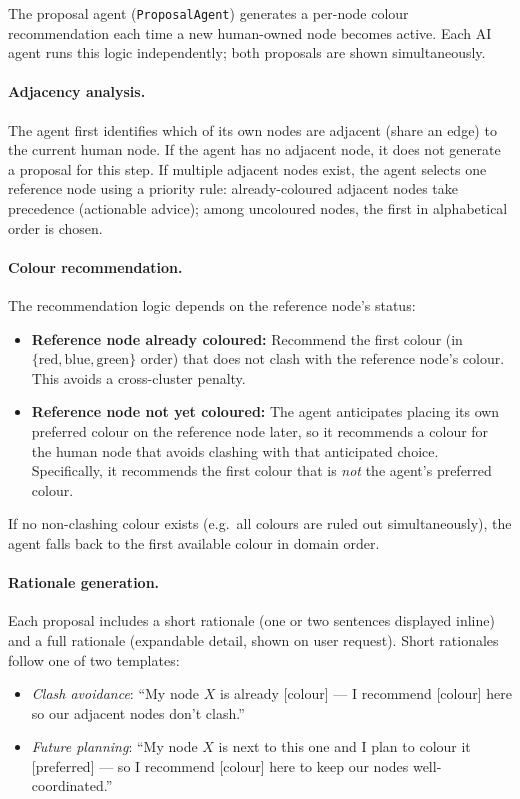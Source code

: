 \documentclass[11pt]{article}
\theoremstyle{definition}
\begin{document}
The proposal agent (\texttt{ProposalAgent}) generates a per-node colour recommendation
each time a new human-owned node becomes active.  Each AI agent runs this logic
independently; both proposals are shown simultaneously.

\paragraph{Adjacency analysis.}
The agent first identifies which of its own nodes are adjacent (share an edge) to the
current human node.  If the agent has no adjacent node, it does not generate a proposal
for this step.  If multiple adjacent nodes exist, the agent selects one reference node
using a priority rule: already-coloured adjacent nodes take precedence (actionable
advice); among uncoloured nodes, the first in alphabetical order is chosen.

\paragraph{Colour recommendation.}
The recommendation logic depends on the reference node's status:
\begin{itemize}[nosep]
  \item \textbf{Reference node already coloured:} Recommend the first colour (in
    $\{\text{red}, \text{blue}, \text{green}\}$ order) that does not clash with the
    reference node's colour.  This avoids a cross-cluster penalty.
  \item \textbf{Reference node not yet coloured:} The agent anticipates placing its own
    preferred colour on the reference node later, so it recommends a colour for the
    human node that avoids clashing with that anticipated choice.  Specifically, it
    recommends the first colour that is \emph{not} the agent's preferred colour.
\end{itemize}
If no non-clashing colour exists (e.g.\ all colours are ruled out simultaneously), the
agent falls back to the first available colour in domain order.

\paragraph{Rationale generation.}
Each proposal includes a short rationale (one or two sentences displayed inline) and a
full rationale (expandable detail, shown on user request).  Short rationales follow one
of two templates:

\begin{itemize}[nosep]
  \item \textit{Clash avoidance}: ``My node $X$ is already [colour] --- I recommend
    [colour] here so our adjacent nodes don't clash.''
  \item \textit{Future planning}: ``My node $X$ is next to this one and I plan to colour
    it [preferred] --- so I recommend [colour] here to keep our nodes well-coordinated.''
\end{itemize}
\end{document}
